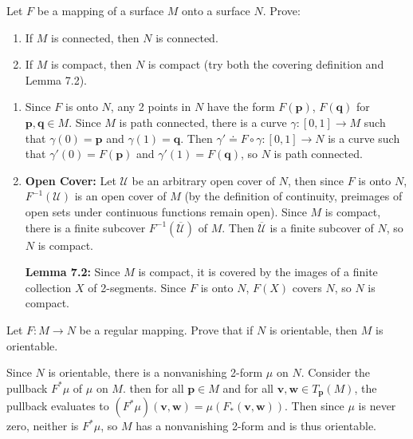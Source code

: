 \documentclass[10pt]{report}
\begin{document}
\begin{exer}[4.7: 2]
Let $F$ be a mapping of a surface $M$ onto a surface $N$. Prove:
\begin{enumerate}
	\item If $M$ is connected, then $N$ is connected.
	\item If $M$ is compact, then $N$ is compact (try both the covering definition and Lemma 7.2).
\end{enumerate}
\end{exer}
\begin{enumerate}
	\item Since $F$ is onto $N$, any 2 points in $N$ have the form $F(\mathbf{p})$, $F( \mathbf{q})$ for $\mathbf{p},\mathbf{q} \in M$. Since $M$ is path connected, there is a curve $\gamma:[0,1]\to M$ such that $\gamma(0)=\mathbf{p}$ and $\gamma(1)=\mathbf{q}$. Then $\gamma' \doteq F \circ \gamma:[0,1]\to N$ is a curve such that $\gamma'(0)=F(\mathbf{p})$ and $\gamma'(1)=F(\mathbf{q})$, so $N$ is path connected.
	\item \textbf{Open Cover:} Let $\mathcal{U}$ be an arbitrary open cover of $N$, then since $F$ is onto $N$, $F^{-1}(\mathcal{U})$ is an open cover of $M$ (by the definition of continuity, preimages of open sets under continuous functions remain open). Since $M$ is compact, there is a finite subcover $F^{-1}(\overline{\mathcal{U}} )$ of $M$. Then $\overline{\mathcal{U}} $ is a finite subcover of $N$, so $N$ is compact.

		\textbf{Lemma 7.2:} Since $M$ is compact, it is covered by the images of a finite collection $X$ of 2-segments. Since $F$ is onto $N$, $F(X)$ covers $N$, so $N$ is compact.
\end{enumerate}

\begin{exer}[4.7: 3]
Let $F:M\to N$ be a regular mapping. Prove that if $N$ is orientable, then $M$ is orientable.
\end{exer}
Since $N$ is orientable, there is a nonvanishing 2-form $\mu$ on $N$. Consider the pullback $F^{*}\mu$ of $\mu$ on $M$. then for all $\mathbf{p} \in M$ and for all $\mathbf{v},\mathbf{w} \in T_{\mathbf{p}}(M)$, the pullback evaluates to $(F^{*}\mu)(\mathbf{v},\mathbf{w}) = \mu(F_{*}(\mathbf{v},\mathbf{w}))$. Then since $\mu$ is never zero, neither is $F^{*}\mu$, so $M$ has a nonvanishing 2-form and is thus orientable.
\end{document}

